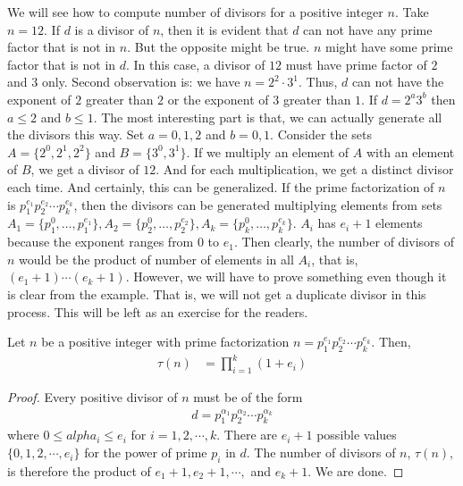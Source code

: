	We will see how to compute number of divisors for a positive integer $n$. Take $n=12$. If $d$ is a divisor of $n$, then it is evident that $d$ can not have any prime factor that is not in $n$. But the opposite might be true. $n$ might have some prime factor that is not in $d$. In this case, a divisor of $12$ must have prime factor of $2$ and $3$ only. Second observation is: we have $n=2^2\cdot3^1$. Thus, $d$ can not have the exponent of $2$ greater than $2$ or the exponent of $3$ greater than $1$. If $d=2^a3^b$ then $a\leq2$ and $b\leq1$. The most interesting part is that, we can actually generate all the divisors this way. Set $a=0,1,2$ and $b=0,1$. Consider the sets $A=\{2^0,2^1,2^2\}$ and $B=\{3^0,3^1\}$. If we multiply an element of $A$ with an element of $B$, we get a divisor of $12$. And for each multiplication, we get a distinct divisor each time. And certainly, this can be generalized. If the prime factorization of $n$ is $p_1^{e_1}p_2^{e_2}\cdots p_k^{e_k}$, then the divisors can be generated multiplying elements from sets $A_1=\{p_1^0,\ldots,p_1^{e_1}\},A_2=\{p_2^{0},\ldots,p_2^{e_2}\},A_k=\{p_k^0,\ldots,p_k^{e_k} \}$. $A_i$ has $e_i+1$ elements because the exponent ranges from $0$ to $e_1$. Then clearly, the number of divisors of $n$ would be the product of number of elements in all $A_i$, that is, $(e_1+1)\cdots(e_k+1)$. However, we will have to prove something even though it is clear from the example. That is, we will not get a duplicate divisor in this process. This will be left as an exercise for the readers.
		\begin{theorem}
			Let $n$ be a positive integer with prime factorization $n=p_1^{e_1}p_2^{e_2}\cdots p_k^{e_k}$. Then,
			\begin{align}
			\tau(n) &= \prod_{i=1}^{k} (1+e_i)\label{eq:dformula-eq1}
			\end{align}
		\end{theorem}

		\begin{proof}
			Every positive divisor of $n$ must be of the form
			\begin{align*}
			d = p_1^{\alpha_1} p_2^{\alpha_2} \cdots p_k^{\alpha_k}
			\end{align*}
			where $0 \leq alpha_i \leq e_i$ for $i=1,2,\cdots,k$. There are $e_i+1$ possible values $\{0, 1, 2, \cdots, e_i\}$ for the power of prime $p_i$ in $d$. The number of divisors of $n$, $\tau(n)$, is therefore the product of $e_1+1, e_2+1, \cdots ,$ and $e_k+1$. We are done.
		\end{proof}


